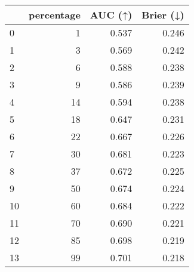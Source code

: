 \begin{tabular}{lrrr}
\toprule
 & percentage & AUC (↑) & Brier (↓) \\
\midrule
0 & 1 & 0.537 & 0.246 \\
1 & 3 & 0.569 & 0.242 \\
2 & 6 & 0.588 & 0.238 \\
3 & 9 & 0.586 & 0.239 \\
4 & 14 & 0.594 & 0.238 \\
5 & 18 & 0.647 & 0.231 \\
6 & 22 & 0.667 & 0.226 \\
7 & 30 & 0.681 & 0.223 \\
8 & 37 & 0.672 & 0.225 \\
9 & 50 & 0.674 & 0.224 \\
10 & 60 & 0.684 & 0.222 \\
11 & 70 & 0.690 & 0.221 \\
12 & 85 & 0.698 & 0.219 \\
13 & 99 & 0.701 & 0.218 \\
\bottomrule
\end{tabular}
